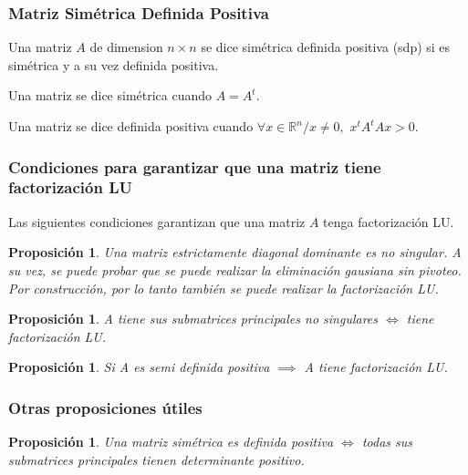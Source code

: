 \documentclass[10pt,a4paper]{article}
\newtheorem{proposition}[theorem]{Proposición}
\newenvironment{definition}[1][Definición]{\begin{trivlist}
\item[\hskip \labelsep {\bfseries #1}]}{\end{trivlist}}
\begin{document}
\subsubsection{Matriz Simétrica Definida Positiva}

\begin{definition}
Una matriz $A$ de dimension $n \times n$ se dice simétrica definida positiva (sdp) si es simétrica y a su vez definida positiva.
\end{definition}

\begin{definition}
Una matriz se dice simétrica cuando $A = A^t$.
\end{definition}

\begin{definition}
Una matriz se dice definida positiva cuando $\forall x \in \mathbb{R}^n / x \neq 0,$ $x^tA^tAx > 0$.
\end{definition}

\subsubsection{Condiciones para garantizar que una matriz tiene factorización LU}

Las siguientes condiciones garantizan que una matriz $A$ tenga factorización LU.

\begin{proposition}
Una matriz estrictamente diagonal dominante es no singular. A su vez, se puede probar que se puede realizar la eliminación gausiana sin pivoteo. Por construcción, por lo tanto también se puede realizar la factorización LU.
\end{proposition}

\begin{proposition}
A tiene sus submatrices principales no singulares $\iff$ tiene factorización LU.
\end{proposition}

\begin{proposition}
Si A es semi definida positiva $\implies$ A tiene factorización LU.
\end{proposition}

\subsubsection{Otras proposiciones útiles}

\begin{proposition}
Una matriz simétrica es definida positiva $\iff$ todas sus submatrices principales tienen determinante positivo.
\end{proposition}
\end{document}
